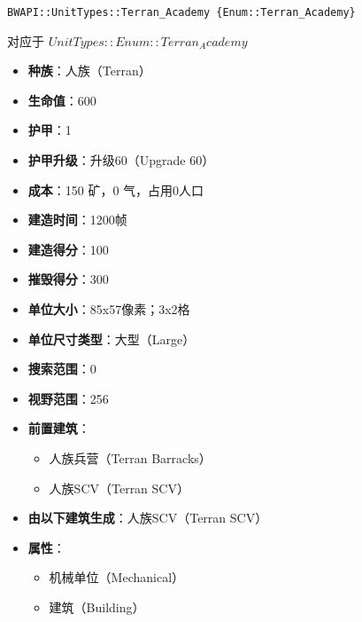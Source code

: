 \begin{tcolorbox}[colback=white, colframe=black!60!white, title=Terran\_Academy(), arc=0mm]
    \begin{verbatim}
BWAPI::UnitTypes::Terran_Academy {Enum::Terran_Academy}
    \end{verbatim}
    对应于  $ UnitTypes::Enum::Terran_Academy $ 
    \begin{itemize}
        \item \textbf{种族}：人族（Terran）
        \item \textbf{生命值}：600
        \item \textbf{护甲}：1
        \item \textbf{护甲升级}：升级60（Upgrade 60）
        \item \textbf{成本}：150 矿，0 气，占用0人口
        \item \textbf{建造时间}：1200帧
        \item \textbf{建造得分}：100
        \item \textbf{摧毁得分}：300
        \item \textbf{单位大小}：85x57像素；3x2格
        \item \textbf{单位尺寸类型}：大型（Large）
        \item \textbf{搜索范围}：0
        \item \textbf{视野范围}：256
        \item \textbf{前置建筑}：
            \begin{itemize}
                \item 人族兵营（Terran Barracks）
                \item 人族SCV（Terran SCV）
            \end{itemize}
        \item \textbf{由以下建筑生成}：人族SCV（Terran SCV）
        \item \textbf{属性}：
            \begin{itemize}
                \item 机械单位（Mechanical）
                \item 建筑（Building）
            \end{itemize}
    \end{itemize}
    
\end{tcolorbox}

